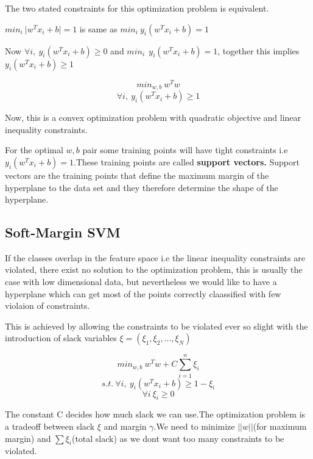 \documentclass[12pt]{article}
\begin{document}
The two stated constraints for this optimization problem is equivalent.

$ min_{i} \  \vert w^{T}x_{i} +b \vert = 1$ is same as $ min_{i} \  y_{i}(w^{T}x_{i} + b) = 1$

Now $\forall i, \ y_{i}(w^{T}x_{i} + b) \geq 0$ and $min_{i} \ \ y_{i}(w^{T}x_{i} + b) = 1$, together this implies $ y_{i}(w^{T}x_{i} + b) \geq 1$
 
 
 
 
 
 
 $$min_{w,b} \  w^{T}w$$
 $$\forall i, \ y_{i}(w^{T}x_{i} + b) \geq 1$$
 
 
 
 
 
 
 
 
 
 
 
 
 Now, this is a convex optimization problem with quadratic objective and linear inequality constraints.
 
 
 For the optimal $w,b$ pair some training points will have tight constraints i.e $y_{i}(w^{T}x_{i} + b) = 1$.These training points are called \textbf{support vectors.} Support vectors  are the training points that define the maximum margin of the hyperplane to the data set and they therefore determine the shape of the hyperplane. 
 
 
 \subsection{Soft-Margin SVM}
 
 
 If the classes  overlap in the feature space i.e the linear inequality constraints are violated, there exist no solution to the optimization problem, this is usually the case with low dimensional data, but nevertheless we would like to have a hyperplane which can get most of the points correctly claassified with few violaion of constraints.
 
 
This is achieved by allowing the constraints to be violated ever so slight with the introduction of slack variables $\xi = (\xi_{1},\xi_{2}, ..., \xi_{N})$ 
   
   $$min_{w,b} \  w^{T}w + C \sum_{i =1}^{n} \xi_{i}$$
   $$ s.t. \ \forall i, \ y_{i}(w^{T}x_{i} + b) \geq 1- \xi_{i}$$
   $$ \forall i \ \xi_{i} \geq 0$$ 
   
The constant C decides how much slack we can use.The optimization problem  is a tradeoff between slack $ \xi$ and margin $\gamma$.We need to minimize $\vert \vert w \vert \vert$(for maximum margin) and $\sum \xi_{i}$(total slack) as we dont want too many constraints to be violated.
  
\end{document}
